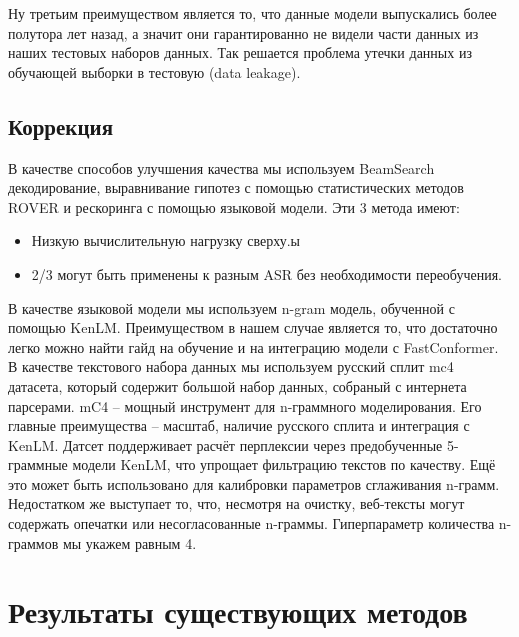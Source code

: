 Ну третьим преимуществом является то, что данные модели выпускались более полутора лет назад, а значит они гарантированно не видели части данных из наших тестовых наборов данных.
Так решается проблема утечки данных из обучающей выборки в тестовую (data leakage).

\subsection{Коррекция}

В качестве способов улучшения качества мы используем BeamSearch декодирование, выравнивание гипотез с помощью статистических методов ROVER и рескоринга с помощью языковой модели.
Эти 3 метода имеют:
\begin{itemize}
  \item Низкую вычислительную нагрузку сверху.ы
  \item 2/3 могут быть применены к разным ASR без необходимости переобучения.
\end{itemize}

В качестве языковой модели мы используем n-gram модель, обученной с помощью KenLM.
Преимуществом в нашем случае является то, что достаточно легко можно найти гайд на обучение и на интеграцию модели с FastConformer.
В качестве текстового набора данных мы используем русский сплит mc4 датасета, который содержит большой набор данных, собраный с интернета парсерами.
mC4 -- мощный инструмент для n-граммного моделирования.
Его главные преимущества -- масштаб, наличие русского сплита и интеграция с KenLM.
Датсет поддерживает расчёт перплексии через предобученные 5-граммные модели KenLM, что упрощает фильтрацию текстов по качеству.
Ещё это может быть использовано для калибровки параметров сглаживания n-грамм.
Недостатком же выступает то, что, несмотря на очистку, веб-тексты могут содержать опечатки или несогласованные n-граммы.
Гиперпараметр количества n-граммов мы укажем равным 4.

\section{Результаты существующих методов}


